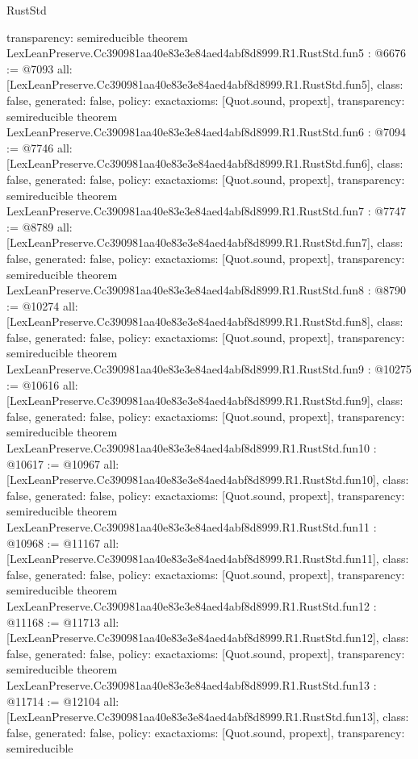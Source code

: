 \begin{lexlean}{RustStd}
\begin{coremodule}
{  transparency: semireducible
}
theorem LexLeanPreserve.Cc390981aa40e83e3e84aed4abf8d8999.R1.RustStd.fun5 : @6676 := @7093 {
  all: [LexLeanPreserve.Cc390981aa40e83e3e84aed4abf8d8999.R1.RustStd.fun5],
  class: false,
  generated: false,
  policy: exact{axioms: [Quot.sound, propext]},
  transparency: semireducible
}
theorem LexLeanPreserve.Cc390981aa40e83e3e84aed4abf8d8999.R1.RustStd.fun6 : @7094 := @7746 {
  all: [LexLeanPreserve.Cc390981aa40e83e3e84aed4abf8d8999.R1.RustStd.fun6],
  class: false,
  generated: false,
  policy: exact{axioms: [Quot.sound, propext]},
  transparency: semireducible
}
theorem LexLeanPreserve.Cc390981aa40e83e3e84aed4abf8d8999.R1.RustStd.fun7 : @7747 := @8789 {
  all: [LexLeanPreserve.Cc390981aa40e83e3e84aed4abf8d8999.R1.RustStd.fun7],
  class: false,
  generated: false,
  policy: exact{axioms: [Quot.sound, propext]},
  transparency: semireducible
}
theorem LexLeanPreserve.Cc390981aa40e83e3e84aed4abf8d8999.R1.RustStd.fun8 : @8790 := @10274 {
  all: [LexLeanPreserve.Cc390981aa40e83e3e84aed4abf8d8999.R1.RustStd.fun8],
  class: false,
  generated: false,
  policy: exact{axioms: [Quot.sound, propext]},
  transparency: semireducible
}
theorem LexLeanPreserve.Cc390981aa40e83e3e84aed4abf8d8999.R1.RustStd.fun9 : @10275 := @10616 {
  all: [LexLeanPreserve.Cc390981aa40e83e3e84aed4abf8d8999.R1.RustStd.fun9],
  class: false,
  generated: false,
  policy: exact{axioms: [Quot.sound, propext]},
  transparency: semireducible
}
theorem LexLeanPreserve.Cc390981aa40e83e3e84aed4abf8d8999.R1.RustStd.fun10 : @10617 := @10967 {
  all: [LexLeanPreserve.Cc390981aa40e83e3e84aed4abf8d8999.R1.RustStd.fun10],
  class: false,
  generated: false,
  policy: exact{axioms: [Quot.sound, propext]},
  transparency: semireducible
}
theorem LexLeanPreserve.Cc390981aa40e83e3e84aed4abf8d8999.R1.RustStd.fun11 : @10968 := @11167 {
  all: [LexLeanPreserve.Cc390981aa40e83e3e84aed4abf8d8999.R1.RustStd.fun11],
  class: false,
  generated: false,
  policy: exact{axioms: [Quot.sound, propext]},
  transparency: semireducible
}
theorem LexLeanPreserve.Cc390981aa40e83e3e84aed4abf8d8999.R1.RustStd.fun12 : @11168 := @11713 {
  all: [LexLeanPreserve.Cc390981aa40e83e3e84aed4abf8d8999.R1.RustStd.fun12],
  class: false,
  generated: false,
  policy: exact{axioms: [Quot.sound, propext]},
  transparency: semireducible
}
theorem LexLeanPreserve.Cc390981aa40e83e3e84aed4abf8d8999.R1.RustStd.fun13 : @11714 := @12104 {
  all: [LexLeanPreserve.Cc390981aa40e83e3e84aed4abf8d8999.R1.RustStd.fun13],
  class: false,
  generated: false,
  policy: exact{axioms: [Quot.sound, propext]},
  transparency: semireducible
}
\end{coremodule}
\end{lexlean}
